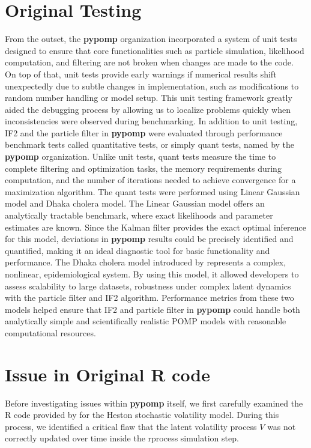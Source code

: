 \documentclass[11pt]{report}
\begin{document}
\section{Original Testing}
From the outset, the \textbf{pypomp} organization incorporated a system of unit tests designed to ensure that core functionalities such as particle simulation, likelihood computation, and filtering are not broken when changes are made to the code. On top of that, unit tests provide early warnings if numerical results shift unexpectedly due to subtle changes in implementation, such as modifications to random number handling or model setup. This unit testing framework greatly aided the debugging process by allowing us to localize problems quickly when inconsistencies were observed during benchmarking.
In addition to unit testing, IF2 and the particle filter in \textbf{pypomp} were evaluated through performance benchmark tests called quantitative tests, or simply quant tests, named by the \textbf{pypomp} organization. Unlike unit tests, quant tests measure the time to complete filtering and optimization tasks, the memory requirements during computation, and the number of iterations needed to achieve convergence for a maximization algorithm. The quant tests were performed using Linear Gaussian model and Dhaka cholera model. The Linear Gaussian model offers an analytically tractable benchmark, where exact likelihoods and parameter estimates are known. Since the Kalman filter provides the exact optimal inference for this model, deviations in \textbf{pypomp} results could be precisely identified and quantified, making it an ideal diagnostic tool for basic functionality and performance. The Dhaka cholera model introduced by \citet{king2008inapparent} represents a complex, nonlinear, epidemiological system. By using this model, it allowed developers to assess scalability to large datasets, robustness under complex latent dynamics with the particle filter and IF2 algorithm. Performance metrics from these two models helped ensure that IF2 and particle filter in \textbf{pypomp} could handle both analytically simple and scientifically realistic POMP models with reasonable computational resources.

\section{Issue in Original R code}
Before investigating issues within \textbf{pypomp} itself, we first carefully examined the R code provided by \citet{sunmodel} for the Heston stochastic volatility model. During this process, we identified a critical flaw that the latent volatility process $V$ was not correctly updated over time inside the rprocess simulation step.
\end{document}
